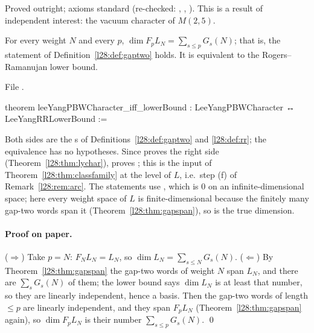 \begin{status}
Proved outright; axioms standard (re-checked: , ,
). This is a result of independent interest: the vacuum character of $M(2,5)$.
\end{status}

\begin{theorem}\label{l28:thm:pbwchar}
For every weight $N$ and every $p$, $\dim F_pL_N=\sum_{s\le p}G_s(N)$; that is, the statement  of
Definition~\ref{l28:def:gaptwo} holds. It is equivalent to the Rogers--Ramanujan lower bound.
\end{theorem}

\noindent File .
\begin{leancode}
theorem leeYangPBWCharacter_iff_lowerBound : LeeYangPBWCharacter ↔ LeeYangRRLowerBound :=
\end{leancode}

\begin{dictionary}
Both sides are the s of Definitions~\ref{l28:def:gaptwo} and \ref{l28:def:rr}; the equivalence has no hypotheses. Since
 proves the right side (Theorem~\ref{l28:thm:lychar}),
 proves ; this is the input
 of Theorem~\ref{l28:thm:classfamily} at the level of $L$, i.e.\ step (f) of Remark~\ref{l28:rem:arc}. The statements use
, which is $0$ on an infinite-dimensional space; here every weight space of $L$ is finite-dimensional because the
finitely many gap-two words span it (Theorem~\ref{l28:thm:gapspan}), so  is the true dimension.
\end{dictionary}

\paragraph{Proof on paper.} ($\Rightarrow$) Take $p=N$: $F_NL_N=L_N$, so $\dim L_N=\sum_{s\le N}G_s(N)$. ($\Leftarrow$) By
Theorem~\ref{l28:thm:gapspan} the gap-two words of weight $N$ span $L_N$, and there are $\sum_sG_s(N)$ of them; the lower bound says
$\dim L_N$ is at least that number, so they are linearly independent, hence a basis. Then the gap-two words of length $\le p$ are linearly
independent, and they span $F_pL_N$ (Theorem~\ref{l28:thm:gapspan} again), so $\dim F_pL_N$ is their number $\sum_{s\le p}G_s(N)$. \qed

